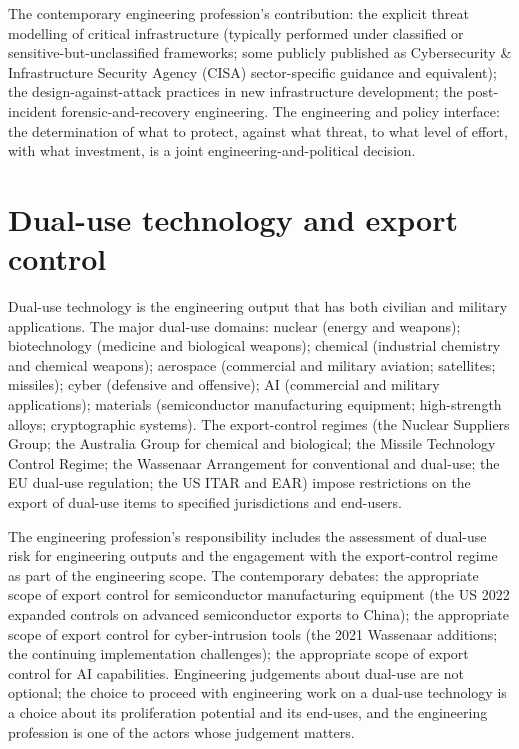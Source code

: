 The contemporary engineering profession's contribution: the explicit threat modelling of critical infrastructure (typically performed under classified or sensitive-but-unclassified frameworks; some publicly published as Cybersecurity \& Infrastructure Security Agency (CISA) sector-specific guidance and equivalent); the design-against-attack practices in new infrastructure development; the post-incident forensic-and-recovery engineering. The engineering and policy interface: the determination of what to protect, against what threat, to what level of effort, with what investment, is a joint engineering-and-political decision.

\section{Dual-use technology and export control}

Dual-use technology is the engineering output that has both civilian and military applications. The major dual-use domains: nuclear (energy and weapons); biotechnology (medicine and biological weapons); chemical (industrial chemistry and chemical weapons); aerospace (commercial and military aviation; satellites; missiles); cyber (defensive and offensive); AI (commercial and military applications); materials (semiconductor manufacturing equipment; high-strength alloys; cryptographic systems). The export-control regimes (the Nuclear Suppliers Group; the Australia Group for chemical and biological; the Missile Technology Control Regime; the Wassenaar Arrangement for conventional and dual-use; the EU dual-use regulation; the US ITAR and EAR) impose restrictions on the export of dual-use items to specified jurisdictions and end-users.

The engineering profession's responsibility includes the assessment of dual-use risk for engineering outputs and the engagement with the export-control regime as part of the engineering scope. The contemporary debates: the appropriate scope of export control for semiconductor manufacturing equipment (the US 2022 expanded controls on advanced semiconductor exports to China); the appropriate scope of export control for cyber-intrusion tools (the 2021 Wassenaar additions; the continuing implementation challenges); the appropriate scope of export control for AI capabilities. Engineering judgements about dual-use are not optional; the choice to proceed with engineering work on a dual-use technology is a choice about its proliferation potential and its end-uses, and the engineering profession is one of the actors whose judgement matters.

